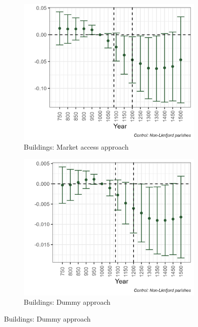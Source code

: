 \begin{figure}[h!]
\begin{subfigure}[b]{0.45\textwidth}
    \end{subfigure}
    \vspace{0.45cm}
    \begin{subfigure}[b]{0.45\textwidth}
        \centering
        \caption{\label{fig:arch1c} Buildings: Market access approach}
        \includegraphics[width=\textwidth]{Plots/Regression_plots/arch_MA_buildings_matched_norm.png}
    \end{subfigure}
    \hfill
    \begin{subfigure}[b]{0.45\textwidth}
        \centering
        \caption{\label{fig:arch1d} Buildings: Dummy approach}
        \includegraphics[width=\textwidth]{Plots/Regression_plots/arch_dummy_buildings_matched_norm.png}
    \end{subfigure}
    \label{fig:arch_reg2}
\end{figure}


